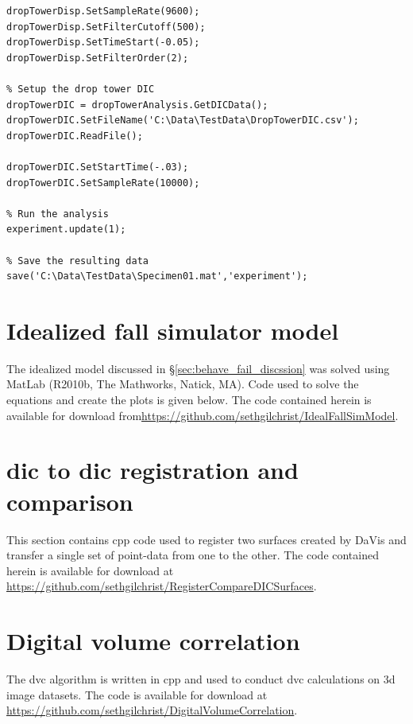 \begin{singlespace}
\begin{lstlisting}
dropTowerDisp.SetSampleRate(9600);
dropTowerDisp.SetFilterCutoff(500);
dropTowerDisp.SetTimeStart(-0.05);
dropTowerDisp.SetFilterOrder(2);

% Setup the drop tower DIC
dropTowerDIC = dropTowerAnalysis.GetDICData();
dropTowerDIC.SetFileName('C:\Data\TestData\DropTowerDIC.csv');
dropTowerDIC.ReadFile();

dropTowerDIC.SetStartTime(-.03);
dropTowerDIC.SetSampleRate(10000);

% Run the analysis
experiment.update(1);

% Save the resulting data
save('C:\Data\TestData\Specimen01.mat','experiment');
\end{lstlisting}
\end{singlespace}
\begin{singlespace}

\end{singlespace}

\section{Idealized fall simulator model}
\label{sec:code_ideal_fs}
The idealized model discussed in \S\ref{sec:behave_fail_discssion} was solved using MatLab (R2010b, The Mathworks, Natick, MA).
Code used to solve the equations and create the plots is given below.
The code contained herein is available for download from\newline \url{https://github.com/sethgilchrist/IdealFallSimModel}.
\begin{singlespace}

\end{singlespace}

\section{\acs*{dic} to \acs*{dic} registration and comparison}
\label{sec:code_dic_dic_register_compare}
This section contains \ac{cpp} code used to register two surfaces created by DaVis and transfer a single set of point-data from one to the other.
The code contained herein is available for download at \url{https://github.com/sethgilchrist/RegisterCompareDICSurfaces}.
\begin{singlespace}
	
\end{singlespace}

\section{Digital volume correlation}
\label{sec:code_dvc}
The \acf{dvc} algorithm is written in \ac{cpp} and used to conduct \ac{dvc} calculations on \acs{3d} image datasets.
The code is available for download at \url{https://github.com/sethgilchrist/DigitalVolumeCorrelation}.

